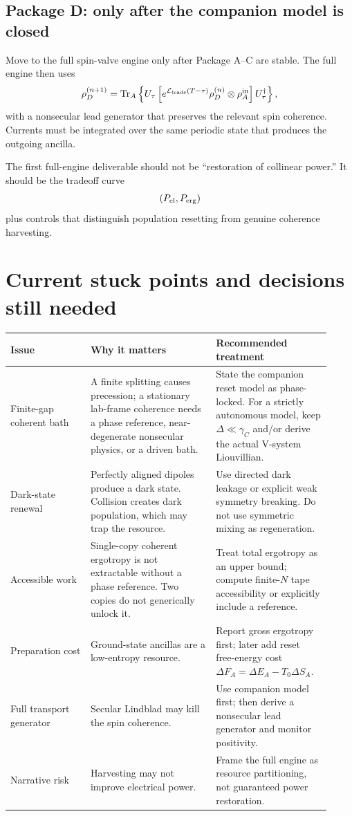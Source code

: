 \documentclass[11pt,a4paper]{article}
\newcommand{\Tr}{\operatorname{Tr}}
\begin{document}
\subsection{Package D: only after the companion model is closed}

Move to the full spin-valve engine only after Package A--C are stable. The full engine then uses
\begin{equation}
\rho_D^{(n+1)}=\Tr_A\left\{U_\tau\left[e^{\mathcal L_{\rm leads}(T-\tau)}\rho_D^{(n)}\otimes\rho_A^{\rm in}\right]U_\tau^\dagger\right\},
\end{equation}
with a nonsecular lead generator that preserves the relevant spin coherence. Currents must be integrated over the same periodic state that produces the outgoing ancilla.

The first full-engine deliverable should not be ``restoration of collinear power.'' It should be the tradeoff curve
\begin{equation}
(P_{\rm el},P_{\rm erg})
\end{equation}
plus controls that distinguish population resetting from genuine coherence harvesting.

\section{Current stuck points and decisions still needed}

\begin{longtable}{p{0.23\linewidth}p{0.36\linewidth}p{0.33\linewidth}}
\toprule
Issue & Why it matters & Recommended treatment \\
\midrule
Finite-gap coherent bath & A finite splitting causes precession; a stationary lab-frame coherence needs a phase reference, near-degenerate nonsecular physics, or a driven bath. & State the companion reset model as phase-locked. For a strictly autonomous model, keep $\Delta\ll\gamma_C$ and/or derive the actual V-system Liouvillian. \\
Dark-state renewal & Perfectly aligned dipoles produce a dark state. Collision creates dark population, which may trap the resource. & Use directed dark leakage or explicit weak symmetry breaking. Do not use symmetric mixing as regeneration. \\
Accessible work & Single-copy coherent ergotropy is not extractable without a phase reference. Two copies do not generically unlock it. & Treat total ergotropy as an upper bound; compute finite-$N$ tape accessibility or explicitly include a reference. \\
Preparation cost & Ground-state ancillas are a low-entropy resource. & Report gross ergotropy first; later add reset free-energy cost $\Delta F_A=\Delta E_A-T_0\Delta S_A$. \\
Full transport generator & Secular Lindblad may kill the spin coherence. & Use companion model first; then derive a nonsecular lead generator and monitor positivity. \\
Narrative risk & Harvesting may not improve electrical power. & Frame the full engine as resource partitioning, not guaranteed power restoration. \\
\bottomrule
\end{longtable}
\end{document}
